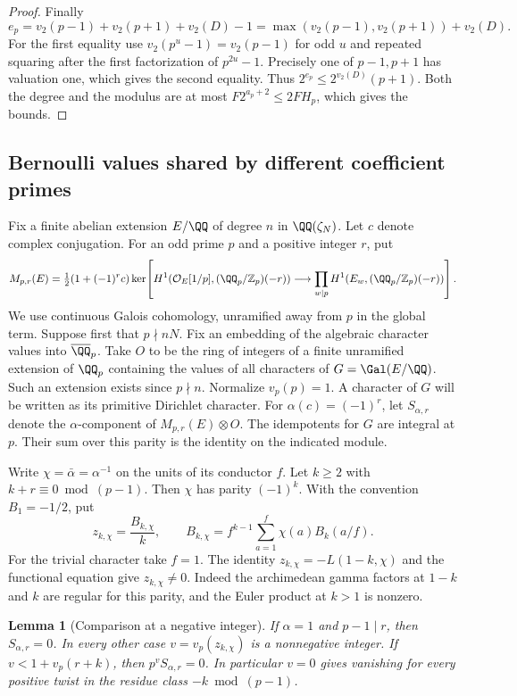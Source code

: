 \documentclass[a4paper,11pt]{article}
\newtheorem{lemma}[proposition]{Lemma}
\theoremstyle{definition}
\theoremstyle{remark}
\newcommand{\ZZ}{\mathbb Z}\newcommand{\ord}{\operatorname{ord}}
\numberwithin{equation}{section}
\begin{document}
\begin{proof}
Finally
\[
 e_p=v_2(p-1)+v_2(p+1)+v_2(D)-1
    =\max(v_2(p-1),v_2(p+1))+v_2(D).
\]
For the first equality use \(v_2(p^u-1)=v_2(p-1)\) for odd
\(u\) and repeated squaring after the first factorization of
\(p^{2u}-1\). Precisely one of \(p-1,p+1\) has valuation one,
which gives the second equality. Thus \(2^{e_p}\le
2^{v_2(D)}(p+1)\). Both the degree and the modulus are at
most \(F2^{a_p+2}\le 2F H_p\), which gives the bounds.
\end{proof}

\subsection{Bernoulli values shared by different coefficient primes}\label{nav:III-28}
\label{sec:shared201}

Fix a finite abelian extension \(E/\QQ\) of degree \(n\) in
\(\QQ(\zeta_N)\). Let \(c\) denote complex conjugation. For an
odd prime \(p\) and a positive integer \(r\), put
\[
 M_{p,r}(E)=\tfrac12(1+(-1)^r c)\ker\!\left[
 H^1(\mathcal O_E[1/p],(\QQ_p/\ZZ_p)(-r))
 \longrightarrow\prod_{w\mid p} H^1(E_w,(\QQ_p/\ZZ_p)(-r))\right].
\]
We use continuous Galois cohomology, unramified away from \(p\) in
the global term. Suppose first that \(p\nmid nN\). Fix an embedding
of the algebraic character values into \(\overline{\QQ}_p\).
Take \(O\) to be the ring of integers of a finite unramified
extension of \(\QQ_p\) containing the values of all characters of
\(G=\Gal(E/\QQ)\). Such an extension exists since \(p\nmid n\).
Normalize \(v_p(p)=1\). A character of \(G\) will be written as its
primitive Dirichlet character. For \(\alpha(c)=(-1)^r\), let
\(S_{\alpha,r}\) denote the \(\alpha\)-component of \(M_{p,r}(E)\otimes O\).
The idempotents for \(G\) are integral at \(p\). Their sum over this
parity is the identity on the indicated module.

Write \(\chi=\bar\alpha=\alpha^{-1}\) on the units of its conductor
\(f\). Let \(k\ge2\) with \(k+r\equiv0\bmod(p-1)\). Then \(\chi\)
has parity \((-1)^k\). With the convention \(B_1=-1/2\), put
\[
 z_{k,\chi}=\frac{B_{k,\chi}}{k},\qquad
 B_{k,\chi}=f^{k-1}\sum_{a=1}^f\chi(a)B_k(a/f).
\]
For the trivial character take \(f=1\). The identity
\(z_{k,\chi}=-L(1-k,\chi)\) and the functional equation give
\(z_{k,\chi}\ne0\). Indeed the archimedean gamma factors at
\(1-k\) and \(k\) are regular for this parity, and the Euler
product at \(k>1\) is nonzero.

\begin{lemma}[Comparison at a negative integer]\label{lem:shared201}
If \(\alpha=1\) and \(p-1\mid r\), then \(S_{\alpha,r}=0\).
In every other case \(v=v_p(z_{k,\chi})\) is a nonnegative integer.
If \(v<1+v_p(r+k)\), then \(p^v S_{\alpha,r}=0\).
In particular \(v=0\) gives vanishing for every positive twist in
the residue class \(-k\bmod(p-1)\).
\end{lemma}
\end{document}
